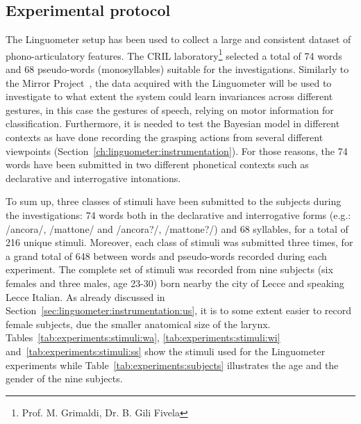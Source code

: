 \subsection{Experimental protocol}
\label{sec:experiments:protocol}
The Linguometer setup has been used to collect a large and consistent dataset
of phono-articulatory features.
The CRIL laboratory\footnote{Prof. M. Grimaldi, Dr. B. Gili Fivela} selected a
total of 74 words and 68 pseudo-words (monosyllables) suitable for the 
investigations.
Similarly to the Mirror Project~\citep{metta.etal:2006}, the data acquired
with the Linguometer will be
used to investigate to what extent the system could learn invariances across 
different gestures, in this case the gestures of speech, relying on motor 
information for classification.
Furthermore, it is needed to test the Bayesian model in different contexts as 
\citet{metta.etal:2006} have done recording the grasping actions from several
different viewpoints (Section~\ref{ch:linguometer:instrumentation}).
For those reasons, the 74 words have been submitted in two different
phonetical contexts such as declarative and interrogative intonations.



To sum up, three classes of stimuli have been submitted to the subjects 
during the investigations: 74 words both in the declarative and interrogative 
forms (e.g.: /ancora/, /mattone/ and /ancora?/, /mattone?/) and 68 syllables, 
for a total of 216 unique stimuli.
Moreover, each class of stimuli was submitted three times, for a grand total 
of 648 between words and pseudo-words recorded during each experiment.
The complete set of stimuli was recorded from nine subjects (six females and
three males, age 23-30) born nearby the city of Lecce and speaking Lecce
Italian.
As already discussed in Section~\ref{sec:linguometer:instrumentation:us}, it is to
some extent easier to record female subjects, due the smaller anatomical size of
the larynx.
Tables~\ref{tab:experiments:stimuli:wa}, \ref{tab:experiments:stimuli:wi} 
and~\ref{tab:experiments:stimuli:ss} show the stimuli used for the
Linguometer experiments while Table~\ref{tab:experiments:subjects} illustrates 
the age and the gender of the nine subjects.


